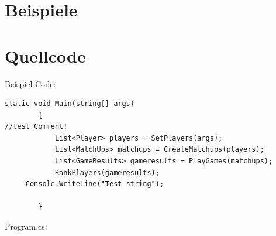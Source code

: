 \documentclass[a4paper,11pt,ngerman]{scrartcl}
\begin{document}
\section{Beispiele}
\section{Quellcode}
Beispiel-Code:
\begin{lstlisting}
static void Main(string[] args)
        {
//test Comment!
            List<Player> players = SetPlayers(args);
            List<MatchUps> matchups = CreateMatchups(players);
            List<GameResults> gameresults = PlayGames(matchups);
            RankPlayers(gameresults);
	 Console.WriteLine("Test string");
            
        }
\end{lstlisting}
Program.cs:

\end{document}
